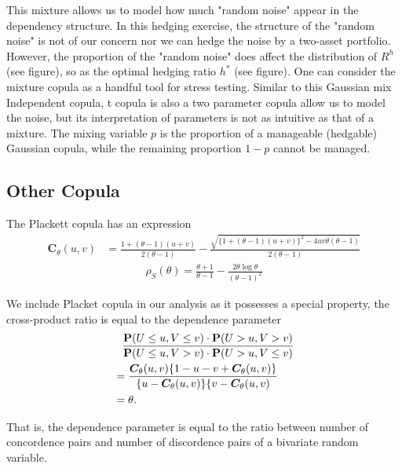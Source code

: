This mixture allows us to model how much "random noise" appear in the dependency structure.
In this hedging exercise, the structure of the "random noise" is not of our concern nor we can
hedge the noise by a two-asset portfolio.
However, the proportion of the "random noise" does affect the distribution of $R^h$ (see figure),
so as the optimal hedging ratio $h^\ast$ (see figure).
One can consider the mixture copula as a handful tool for stress testing.
Similar to this Gaussian mix Independent copula,
t copula is also a two parameter copula allow us to model the noise,
but its interpretation of parameters is not as intuitive as that of a mixture.
The mixing variable $p$ is the proportion of a manageable (hedgable) Gaussian copula,
while the remaining proportion $1-p$ cannot be managed.

\subsection{Other Copula}\label{subsec:other-copula}
The Plackett copula has an expression
\begin{align}
    \bm{C}_{\theta}(u,v) &= \frac{1+(\theta-1)(u+v)}{2(\theta-1)}
                         - \frac{\sqrt{\{
    1+(\theta-1)(u+v)\}^2 - 4uv\theta(\theta-1)}}{2(\theta-1)}
    \end{align}
\begin{align}
    \rho_S(\theta) = \frac{\theta+1}{\theta-1} - \frac{2\theta \log \theta}{(\theta-1)^2}
    \end{align}\medskip

We include Placket copula in our analysis as it possesses a special property,
the cross-product ratio is equal to the dependence parameter
\begin{align}
    &\phantom{=} \frac{{\bf P}(U \leq u, V \leq v) \cdot {\bf P}(U > u, V > v)}
    {{\bf P}(U \leq u, V > v) \cdot {\bf P}(U > u, V \leq v)}\nonumber\\
    &= \frac{\bm{C}_\theta(u,v)\{1-u-v+\bm{C}_\theta(u,v)\}}{\{u-\bm{C}_\theta(u,v)\}\{v-\bm{C}_\theta(u,v)}\nonumber\\
    &= \theta.
    \end{align}\medskip

That is, the dependence parameter is equal to the ratio between number of concordence pairs and number of discordence pairs of a bivariate random variable.
